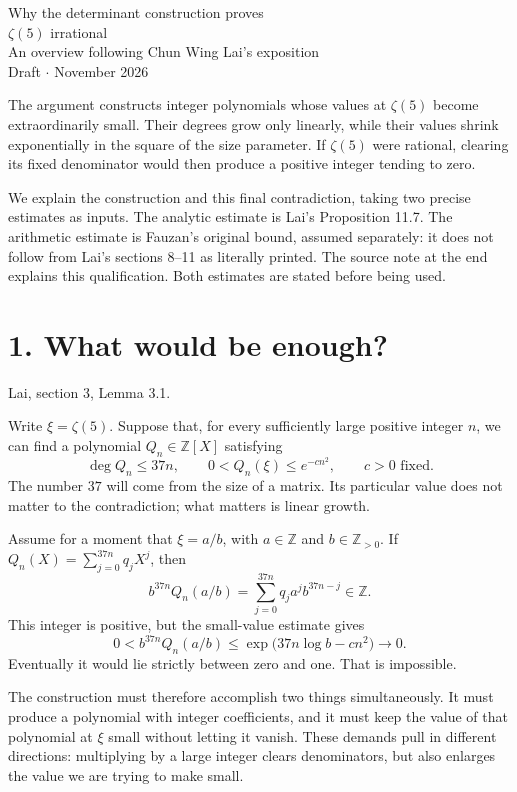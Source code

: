 \documentclass[11pt]{article}
\newcommand{\Z}{\mathbb Z}
\newcommand{\source}[1]{{\small\color{blue!45!black}#1}\par}
\begin{document}
\begin{center}
{\LARGE Why the determinant construction proves\\[3pt]
$\zeta(5)$ irrational}\\[9pt]
{\large An overview following Chun Wing Lai's exposition}\\[5pt]
Draft \enspace$\cdot$ November 2026
\end{center}

The argument constructs integer polynomials whose values at $\zeta(5)$
become extraordinarily small. Their degrees grow only linearly, while their
values shrink exponentially in the square of the size parameter. If
$\zeta(5)$ were rational, clearing its fixed denominator would then produce
a positive integer tending to zero.

We explain the construction and this final contradiction, taking two precise
estimates as inputs. The analytic estimate is Lai's Proposition 11.7.
The arithmetic estimate is Fauzan's original bound, assumed separately:
it does not follow from Lai's sections 8--11 as literally printed.
The source note at the end explains this qualification. Both estimates
are stated before being used.

\section*{1. What would be enough?}
\source{Lai, section 3, Lemma 3.1.}
Write $\xi=\zeta(5)$. Suppose that, for every sufficiently large positive
integer $n$, we can find a polynomial $Q_n\in\Z[X]$ satisfying
\[
 \deg Q_n\leq37n,\qquad 0<Q_n(\xi)\leq e^{-cn^2},
 \qquad c>0\text{ fixed}.
\]
The number $37$ will come from the size of a matrix. Its particular value
does not matter to the contradiction; what matters is linear growth.

Assume for a moment that $\xi=a/b$, with $a\in\Z$ and $b\in\Z_{>0}$.
If $Q_n(X)=\sum_{j=0}^{37n}q_jX^j$, then
\[
 b^{37n}Q_n(a/b)=\sum_{j=0}^{37n}q_j a^j b^{37n-j}\in\Z.
\]
This integer is positive, but the small-value estimate gives
\[
 0<b^{37n}Q_n(a/b)
 \leq \exp\bigl(37n\log b-cn^2\bigr)\longrightarrow0.
\]
Eventually it would lie strictly between zero and one. That is impossible.

The construction must therefore accomplish two things simultaneously.
It must produce a polynomial with integer coefficients, and it must keep
the value of that polynomial at $\xi$ small without letting it vanish.
These demands pull in different directions: multiplying by a large integer
clears denominators, but also enlarges the value we are trying to make small.
\end{document}
